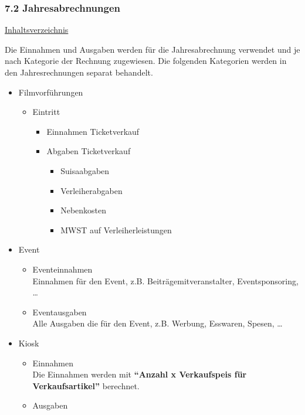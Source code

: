 \documentclass[
]{article}
\providecommand{\tightlist}{%
  \setlength{\itemsep}{0pt}\setlength{\parskip}{0pt}}
\begin{document}
\subsubsection{7.2 Jahresabrechnungen}\label{jahresabrechnungen}

\hyperref[Inhaltsverzeichnis]{Inhaltsverzeichnis}

Die Einnahmen und Ausgaben werden für die Jahresabrechnung verwendet und
je nach Kategorie der Rechnung zugewiesen. Die folgenden Kategorien
werden in den Jahresrechnungen separat behandelt.

\begin{itemize}
\tightlist
\item
  Filmvorführungen

  \begin{itemize}
  \tightlist
  \item
    Eintritt

    \begin{itemize}
    \tightlist
    \item
      Einnahmen Ticketverkauf
    \item
      Abgaben Ticketverkauf

      \begin{itemize}
      \tightlist
      \item
        Suisaabgaben
      \item
        Verleiherabgaben
      \item
        Nebenkosten
      \item
        MWST auf Verleiherleistungen
      \end{itemize}
    \end{itemize}
  \end{itemize}
\item
  Event

  \begin{itemize}
  \tightlist
  \item
    Eventeinnahmen\\
    Einnahmen für den Event, z.B. Beiträgemitveranstalter,
    Eventsponsoring, \ldots{}
  \item
    Eventausgaben\\
    Alle Ausgaben die für den Event, z.B. Werbung, Esswaren, Spesen,
    \ldots{}
  \end{itemize}
\item
  Kiosk

  \begin{itemize}
  \tightlist
  \item
    Einnahmen\\
    Die Einnahmen werden mit \textbf{``Anzahl x Verkaufspeis für
    Verkaufsartikel''} berechnet.
  \item
    Ausgaben


\end{itemize}
\end{itemize}
\end{document}
